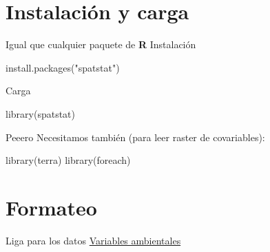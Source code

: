\documentclass[
  11pt,
  ignorenonframetext,
]{beamer}
\newenvironment{Shaded}{}{}
\newcommand{\FunctionTok}[1]{\textcolor[rgb]{0.02,0.16,0.49}{#1}}
\newcommand{\NormalTok}[1]{#1}
\newcommand{\StringTok}[1]{\textcolor[rgb]{0.25,0.44,0.63}{#1}}
\begin{document}
\hypertarget{instalaciuxf3n-y-carga}{%
\section{Instalación y carga}\label{instalaciuxf3n-y-carga}}

\begin{frame}[fragile]{Igual que cualquier paquete de \textbf{R}}
\protect\hypertarget{igual-que-cualquier-paquete-de-r}{}
Instalación

\begin{Shaded}
\begin{Highlighting}[]
\FunctionTok{install.packages}\NormalTok{(}\StringTok{"spatstat"}\NormalTok{)}
\end{Highlighting}
\end{Shaded}

Carga

\begin{Shaded}
\begin{Highlighting}[]
\FunctionTok{library}\NormalTok{(spatstat)}
\end{Highlighting}
\end{Shaded}
\end{frame}

\begin{frame}[fragile]{Peeero}
\protect\hypertarget{peeero}{}
Necesitamos también (para leer raster de covariables):

\begin{Shaded}
\begin{Highlighting}[]
\FunctionTok{library}\NormalTok{(terra)}
\FunctionTok{library}\NormalTok{(foreach)}
\end{Highlighting}
\end{Shaded}
\end{frame}

\hypertarget{formateo}{%
\section{Formateo}\label{formateo}}

\begin{frame}{Liga para los datos}
\protect\hypertarget{liga-para-los-datos}{}
\href{Datos-ejemplos/Covariables.zip}{Variables ambientales}
\end{frame}
\end{document}
